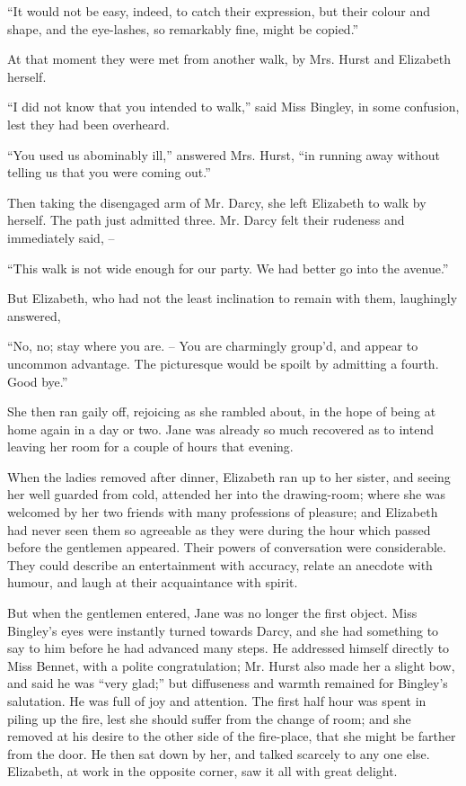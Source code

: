 “It would not be easy, indeed, to catch their expression,
but their colour and shape, and the eye-lashes, so remarkably
fine, might be copied.”

At that moment they were met from another walk, by
Mrs. Hurst and Elizabeth herself.

“I did not know that you intended to walk,” said
Miss Bingley, in some confusion, lest they had been
overheard.

“You used us abominably ill,” answered Mrs. Hurst,
“in running away without telling us that you were coming
out.”

Then taking the disengaged arm of Mr. Darcy, she left
Elizabeth to walk by herself. The path just admitted
three. Mr. Darcy felt their rudeness and immediately
said, --

“This walk is not wide enough for our party. We had
better go into the avenue.”

But Elizabeth, who had not the least inclination to
remain with them, laughingly answered,

“No, no; stay where you are. -- You are charmingly
group’d, and appear to uncommon advantage. The
picturesque would be spoilt by admitting a fourth.
Good bye.”

She then ran gaily off, rejoicing as she rambled about,
in the hope of being at home again in a day or two. Jane
was already so much recovered as to intend leaving her
room for a couple of hours that evening.


When the ladies removed after dinner, Elizabeth ran
up to her sister, and seeing her well guarded from cold,
attended her into the drawing-room; where she was
welcomed by her two friends with many professions of
pleasure; and Elizabeth had never seen them so agreeable
as they were during the hour which passed before
the gentlemen appeared. Their powers of conversation
were considerable. They could describe an entertainment
with accuracy, relate an anecdote with humour, and laugh
at their acquaintance with spirit.

But when the gentlemen entered, Jane was no longer
the first object. Miss Bingley’s eyes were instantly turned
towards Darcy, and she had something to say to him
before he had advanced many steps. He addressed himself
directly to Miss Bennet, with a polite congratulation;
Mr. Hurst also made her a slight bow, and said he was
“very glad;” but diffuseness and warmth remained for
Bingley’s salutation. He was full of joy and attention.
The first half hour was spent in piling up the fire, lest she
should suffer from the change of room; and she removed
at his desire to the other side of the fire-place, that she
might be farther from the door. He then sat down by
her, and talked scarcely to any one else. Elizabeth, at
work in the opposite corner, saw it all with great delight.

